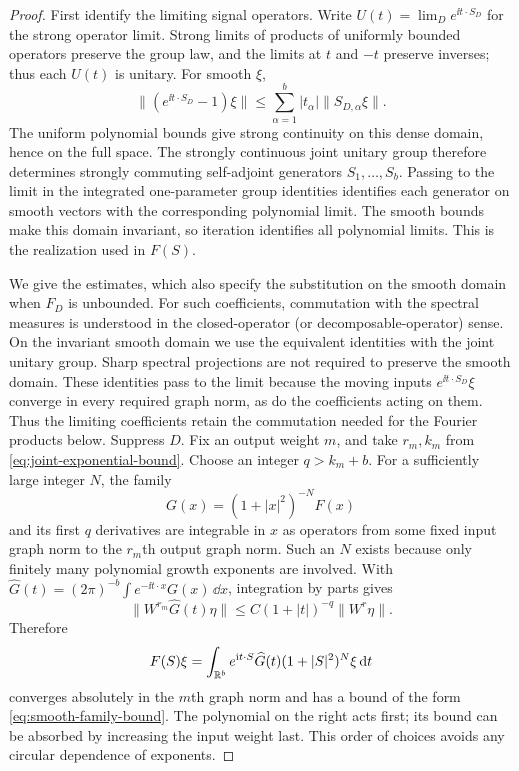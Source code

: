 \begin{proof}
First identify the limiting signal operators.  Write
$U(t)=\lim_D e^{\ii t\cdot S_D}$ for the strong operator limit.
Strong limits of products of uniformly bounded operators preserve
the group law, and the limits at $t$ and $-t$ preserve inverses;
thus each $U(t)$ is unitary.  For smooth $\xi$,
\[
 \|(e^{\ii t\cdot S_D}-1)\xi\|
       \leq\sum_{\alpha=1}^b|t_\alpha|\|S_{D,\alpha}\xi\|.
\]
The uniform polynomial bounds give strong continuity on this dense
domain, hence on the full space.  The strongly continuous joint
unitary group therefore determines strongly commuting self-adjoint
generators $S_1,\ldots,S_b$.  Passing to the limit in the integrated
one-parameter group identities identifies each generator on smooth
vectors with the corresponding polynomial limit.  The smooth bounds
make this domain invariant, so iteration identifies all polynomial
limits.  This is the realization used in $F(S)$.

We give the estimates, which also specify the substitution on the
smooth domain when $F_D$ is unbounded. For such coefficients, commutation
with the spectral measures is understood in the closed-operator
(or decomposable-operator) sense. On the invariant smooth domain we use
the equivalent identities with the joint unitary group. Sharp spectral
projections are not required to preserve the smooth domain. These
identities pass to the limit because the moving inputs
$e^{\ii t\cdot S_D}\xi$ converge in every required graph norm, as do
the coefficients acting on them. Thus the limiting coefficients retain
the commutation needed for the Fourier products below. Suppress $D$.  Fix an
output weight $m$, and take $r_m,k_m$ from
\eqref{eq:joint-exponential-bound}.  Choose an integer
$q>k_m+b$.  For a sufficiently large integer $N$, the family
\[
 G(x)=(1+|x|^2)^{-N}F(x)
\]
and its first $q$ derivatives are integrable in $x$ as operators
from some fixed input graph norm to the $r_m$th output graph
norm.  Such an $N$ exists because only finitely many polynomial
growth exponents are involved.  With
$\widehat G(t)=(2\pi)^{-b}\int e^{-\ii t\cdot x}G(x)\,\dd x$,
integration by parts gives
\[
 \|W^{r_m}\widehat G(t)\eta\|
       \leq C(1+|t|)^{-q}\|W^r\eta\|.
\]
Therefore
\begin{equation}\label{eq:operator-fourier-substitution}
 F(S)\xi=\int_{\mathbb R^b} e^{\mathrm i t\cdot S}\widehat G(t)
                (1+|S|^2)^N\xi\,\mathrm d t
\end{equation}
converges absolutely in the $m$th graph norm and has a bound of
the form \eqref{eq:smooth-family-bound}.  The polynomial on the
right acts first; its bound can be absorbed by increasing the
input weight last.  This order of choices avoids any circular
dependence of exponents.


\end{proof}
